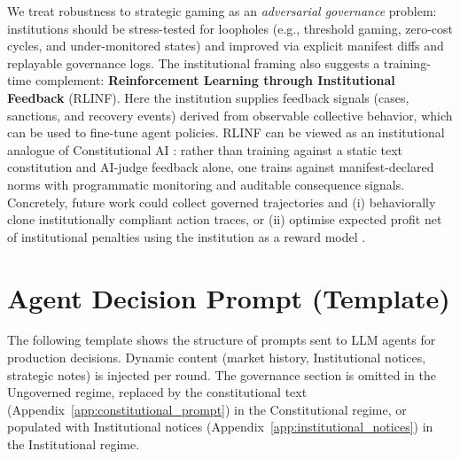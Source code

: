 \documentclass[11pt, a4paper]{article}
\begin{document}
We treat robustness to strategic gaming as an \emph{adversarial governance} problem: institutions should be stress-tested for loopholes (e.g., threshold gaming, zero-cost cycles, and under-monitored states) and improved via explicit manifest diffs and replayable governance logs. The institutional framing also suggests a training-time complement: \textbf{Reinforcement Learning through Institutional Feedback} (RLINF). Here the institution supplies feedback signals (cases, sanctions, and recovery events) derived from observable collective behavior, which can be used to fine-tune agent policies. RLINF can be viewed as an institutional analogue of Constitutional AI \citep{Bai2022Constitutional}: rather than training against a static text constitution and AI-judge feedback alone, one trains against manifest-declared norms with programmatic monitoring and auditable consequence signals. Concretely, future work could collect governed trajectories and (i) behaviorally clone institutionally compliant action traces, or (ii) optimise expected profit net of institutional penalties using the institution as a reward model \citep{Pierucci2026InstitutionalAIGovernance}.

\clearpage



\clearpage
\appendix

\section{Agent Decision Prompt (Template)}
\label{app:decision_prompt}
The following template shows the structure of prompts sent to LLM agents for production decisions. Dynamic content (market history, Institutional notices, strategic notes) is injected per round. The governance section is omitted in the Ungoverned regime, replaced by the constitutional text (Appendix~\ref{app:constitutional_prompt}) in the Constitutional regime, or populated with Institutional notices (Appendix~\ref{app:institutional_notices}) in the Institutional regime.
\end{document}
